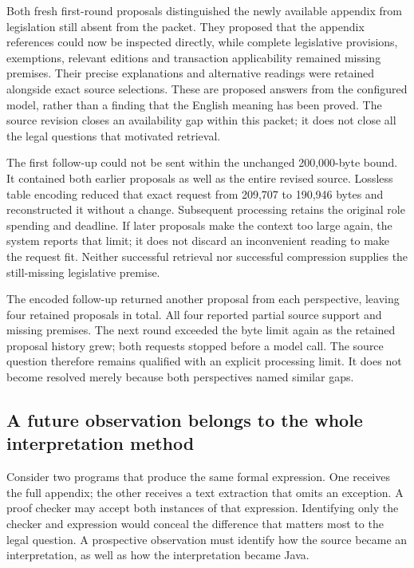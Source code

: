 Both fresh first-round proposals distinguished the newly available appendix
from legislation still absent from the packet. They proposed that the appendix
references could now be inspected directly, while complete legislative
provisions, exemptions, relevant editions and transaction applicability remained
missing premises. Their precise explanations and alternative readings were
retained alongside exact source selections. These are proposed answers from
the configured model, rather than a finding that the English meaning has been
proved. The source revision closes an availability gap within this packet;
it does not close all the legal questions that motivated retrieval.

The first follow-up could not be sent within the unchanged 200,000-byte bound.
It contained both earlier proposals as well as the entire revised source.
Lossless table encoding reduced that exact request from 209,707 to 190,946
bytes and reconstructed it without a change. Subsequent processing retains
the original role spending and deadline. If later proposals make the context
too large again, the system reports that limit; it does not discard an
inconvenient reading to make the request fit. Neither successful retrieval nor
successful compression supplies the still-missing legislative premise.

The encoded follow-up returned another proposal from each perspective, leaving
four retained proposals in total. All four reported partial source support and
missing premises. The next round exceeded the byte limit again as the retained
proposal history grew; both requests stopped before a model call. The source
question therefore remains qualified with an explicit processing limit. It
does not become resolved merely because both perspectives named similar gaps.

\subsection{A future observation belongs to the whole interpretation method}
\label{sec:whole-method-observation}

Consider two programs that produce the same formal expression. One receives
the full appendix; the other receives a text extraction that omits an exception.
A proof checker may accept both instances of that expression. Identifying only
the checker and expression would conceal the difference that matters most to
the legal question. A prospective observation must identify how the source
became an interpretation, as well as how the interpretation became Java.

